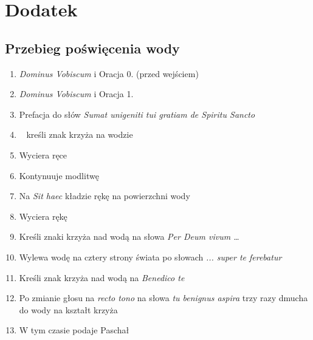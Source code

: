 \section{Dodatek}

\subsection{Przebieg poświęcenia wody}
\label{sec:woda}
\begin{enumerate}
      \item \textit{Dominus Vobiscum} i Oracja 0. (przed wejściem)
      \item \textit{Dominus Vobiscum} i Oracja 1. 
      \item Prefacja do słów \textit{Sumat unigeniti tui gratiam de Spiritu
                  Sancto}
      \item \ii~ kreśli znak krzyża
            \textcolor{red}{} na
            wodzie
      \item Wyciera ręce
      \item Kontynuuje modlitwę
      \item Na \textit{Sit haec} kładzie rękę na powierzchni wody
      \item Wyciera rękę
      \item Kreśli znaki krzyża
            \textcolor{red}{}
            nad wodą na słowa \textit{Per Deum vivum \dots}
            \vspace*{-11pt}
      \item Wylewa wodę na cztery strony świata po słowach \textit{... super te
                  ferebatur} ~~~
            \vspace*{-7pt}
      \item Kreśli znak krzyża nad wodą na \textit{Benedico te}
      \item Po zmianie głosu na \textit{recto tono} na słowa \textit{tu benignus
                  aspira} trzy razy dmucha do wody na kształt krzyża
      \item W tym czasie  podaje Paschał

\end{enumerate}
